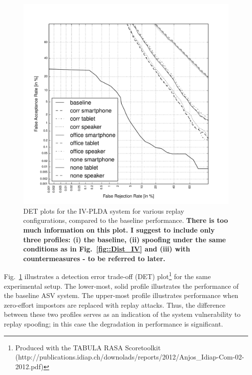 \begin{figure}
	\centering
	\includegraphics[width=1\linewidth]{Figs/DETs_IV.pdf}
	\caption{DET plots for the IV-PLDA system for various replay configurations, compared to the baseline performance. {\bfseries There is too much information on this plot.  I suggest to include only three profiles: (i) the baseline, (ii) spoofing under the same conditions as in Fig.~\ref{fig::Dist_IV} and (iii) with countermeasures - to be referred to later.}}
	\label{fig::DETs_replay_IV}
\end{figure}


Fig.~\ref{fig::DETs_replay_IV} illustrates a detection error trade-off (DET) plot\footnote{Produced with the TABULA RASA Scoretoolkit (http://publications.idiap.ch/downolads/reports/2012/Anjos\_Idiap-Com-02-2012.pdf)} for the same experimental setup.  The lower-most, solid profile illustrates the performance of the baseline ASV system.  The upper-most profile illustrates performance when zero-effort impostors are replaced with replay attacks.  Thus, the difference between these two profiles serves as an indication of the system vulnerability to replay spoofing; in this case the degradation in performance is significant.  


